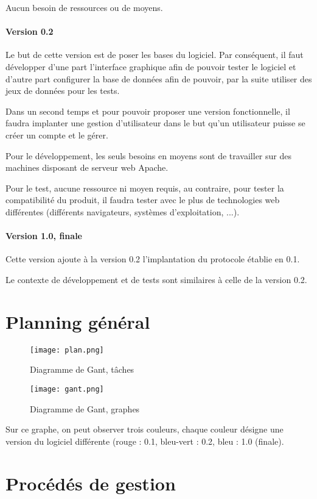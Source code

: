 \documentclass[a4paper,11pt,french]{article}
\begin{document}
Aucun besoin de ressources ou de moyens.

\paragraph{Version 0.2}  Le but de cette version est de poser les
bases du logiciel. Par conséquent, il faut développer d'une part l'interface
graphique afin de pouvoir tester le logiciel et d'autre part configurer la base
de données afin de pouvoir, par la suite utiliser des jeux de données pour les
tests.

Dans un second temps et pour pouvoir proposer une version fonctionnelle, il 
faudra implanter une gestion d'utilisateur dans le but qu'un utilisateur puisse
se créer un compte et le gérer.

Pour le développement, les seuls besoins en moyens sont de travailler sur des 
machines disposant de serveur web Apache.

Pour le test, aucune ressource ni moyen requis, au contraire, pour tester la 
compatibilité du produit, il faudra tester avec le plus de technologies web
différentes (différents navigateurs, systèmes d'exploitation, ...).

\paragraph{Version 1.0, finale} Cette version ajoute à la version 0.2 
l'implantation du protocole établie en 0.1.

Le contexte de développement et de tests sont similaires à celle de la version 
0.2.

\section{Planning général}
\begin{center}
\begin{figure}[h]
\texttt{[image: plan.png]} 
\caption{Diagramme de Gant, tâches}
\end{figure}
\begin{figure}[h]
\texttt{[image: gant.png]} 
\caption{Diagramme de Gant, graphes}
\end{figure}
\end{center}
Sur ce graphe, on peut observer trois couleurs, chaque couleur désigne une
version du logiciel différente (rouge : 0.1, bleu-vert : 0.2, bleu : 1.0
(finale).
\section{Procédés de gestion}
\end{document}
